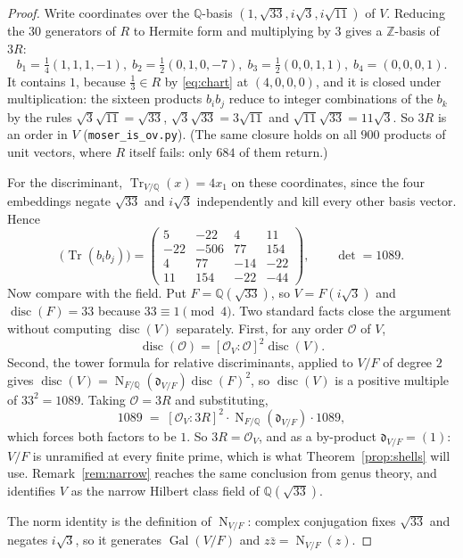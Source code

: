 \documentclass[11pt,reqno]{amsart}
\newcommand{\dsep}{\;}
\newcommand{\dsep}{\quad}
\theoremstyle{plain}
\theoremstyle{definition}
\newcommand{\Z}{\mathbb{Z}}
\newcommand{\Q}{\mathbb{Q}}
\newcommand{\Lat}{R}
\newcommand{\Ok}{\mathcal{O}}
\newcommand{\Gal}{\operatorname{Gal}}
\DeclareMathOperator{\Tr}{Tr}
\DeclareMathOperator{\Nm}{N}
\begin{document}
\begin{proof}
Write coordinates over the $\Q$-basis $(1, \sqrt{33}, i\sqrt3, i\sqrt{11})$ of
$V$. Reducing the $30$ generators of $\Lat$ to Hermite form and multiplying by
$3$ gives a $\Z$-basis of $3\Lat$:
\[
  b_1 = \tfrac14(1,1,1,-1), \dsep
  b_2 = \tfrac12(0,1,0,-7), \dsep
  b_3 = \tfrac12(0,0,1,1), \dsep
  b_4 = (0,0,0,1).
\]
It contains $1$, because $\tfrac13 \in \Lat$ by \eqref{eq:chart} at $(4,0,0,0)$,
and it is closed under multiplication: the sixteen products $b_ib_j$ reduce to
integer combinations of the $b_k$ by the rules $\sqrt3\sqrt{11} = \sqrt{33}$,
$\sqrt3\sqrt{33} = 3\sqrt{11}$ and $\sqrt{11}\sqrt{33} = 11\sqrt3$. So $3\Lat$ is
an order in $V$ (\texttt{moser\_is\_ov.py}). (The same closure holds on all $900$
products of unit vectors, where $\Lat$ itself fails: only $684$ of them return.)

For the discriminant, $\Tr_{V/\Q}(x) = 4x_1$ on these coordinates, since the four
embeddings negate $\sqrt{33}$ and $i\sqrt3$ independently and kill every other
basis vector. Hence
\[
  \bigl(\Tr(b_ib_j)\bigr) =
  \begin{pmatrix}
      5 & -22 &   4 &  11\\
    -22 &-506 &  77 & 154\\
      4 &  77 & -14 & -22\\
     11 & 154 & -22 & -44
  \end{pmatrix},
  \qquad \det = 1089 .
\]
Now compare with the field. Put $F = \Q(\sqrt{33})$, so $V = F(i\sqrt3)$ and
$\operatorname{disc}(F) = 33$ because $33 \equiv 1 \pmod 4$. Two standard facts
close the argument without computing $\operatorname{disc}(V)$ separately. First,
for any order $\mathcal O$ of $V$,
\[
  \operatorname{disc}(\mathcal O) = [\Ok_V : \mathcal O]^2 \operatorname{disc}(V).
\]
Second, the tower formula for relative discriminants, applied to $V/F$ of
degree $2$ gives
$\operatorname{disc}(V) = \Nm_{F/\Q}(\mathfrak d_{V/F})\operatorname{disc}(F)^2$,
so $\operatorname{disc}(V)$ is a positive multiple of $33^2 = 1089$. Taking
$\mathcal O = 3\Lat$ and substituting,
\[
  1089 \;=\; [\Ok_V : 3\Lat]^2 \cdot \Nm_{F/\Q}(\mathfrak d_{V/F}) \cdot 1089 ,
\]
which forces both factors to be $1$. So $3\Lat = \Ok_V$, and as a by-product
$\mathfrak d_{V/F} = (1)$: $V/F$ is unramified at every finite prime, which is
what Theorem~\ref{prop:shells} will use. Remark~\ref{rem:narrow} reaches the same
conclusion from genus theory, and identifies $V$ as the narrow Hilbert class
field of $\Q(\sqrt{33})$.

The norm identity is the definition of $\Nm_{V/F}$: complex conjugation fixes
$\sqrt{33}$ and negates $i\sqrt3$, so it generates $\Gal(V/F)$ and
$z\bar z = \Nm_{V/F}(z)$.
\end{proof}
\end{document}
